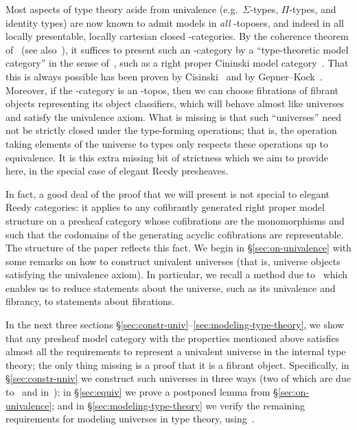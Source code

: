 \documentclass{amsart}
\theoremstyle{remark}
{\newtheorem{{rmk}}[thm]{{Remark}}}
\numberwithin{equation}{section}
\theoremstyle{plain}
\begin{document}
\begin{rmk}
  Most aspects of type theory aside from univalence (e.g.\ $\Sigma$-types, $\Pi$-types, and identity types) are now known to admit models in \emph{all} \io-toposes, and indeed in all locally presentable, locally cartesian closed \io-categories.
  By the coherence theorem of~\cite{lw:localuniv} (see also~\cite{awodey:natmodels}), it suffices to present such an \io-category by a ``type-theoretic model category'' in the sense of~\cite{shulman:invdia}, such as a right proper Cininski model category~\cite{cisinski:topos,cisinski:presheaves}.
  That this is always possible has been proven by Cisinski~\cite{cisinski:lccc-rpcmc} and by Gepner--Kock~\cite{gk:univlcc}.
  Moreover, if the \io-category is an \io-topos, then we can choose fibrations of fibrant objects representing its object classifiers, which will behave almost like universes and satisfy the univalence axiom.
  What is missing is that such ``universes'' need not be strictly closed under the type-forming operations; that is, the operation taking elements of the universe to types only respects these operations up to equivalence.
  It is this extra missing bit of strictness which we aim to provide here, in the special case of elegant Reedy presheaves.
\end{rmk}

In fact, a good deal of the proof that we will present is not special to elegant Reedy categories: it applies to any cofibrantly generated right proper model structure on a presheaf category whose cofibrations are the monomorphisms and such that the codomains of the generating acyclic cofibrations are representable.
The structure of the paper reflects this fact.
We begin in \S\ref{sec:on-univalence} with some remarks on how to construct univalent universes (that is, universe objects satisfying the univalence axiom).
In particular, we recall a method due to~\cite{klv:ssetmodel} which enables us to reduce statements about the universe, such as its univalence and fibrancy, to statements about fibrations.

In the next three sections \S\ref{sec:constr-univ}--\ref{sec:modeling-type-theory}, we show that any presheaf model category with the properties mentioned above satisfies almost all the requirements to represent a univalent universe in the internal type theory; the only thing missing is a proof that it is a fibrant object.
Specifically, in \S\ref{sec:constr-univ} we construct such universes in three ways (two of which are due to~\cite{klv:ssetmodel} and in~\cite{streicher:ttuniv}); in \S\ref{sec:equiv} we prove a postponed lemma from \S\ref{sec:on-univalence}; and in \S\ref{sec:modeling-type-theory} we verify the remaining requirements for modeling universes in type theory, using~\cite{lw:localuniv,klv:ssetmodel}.
\end{document}
